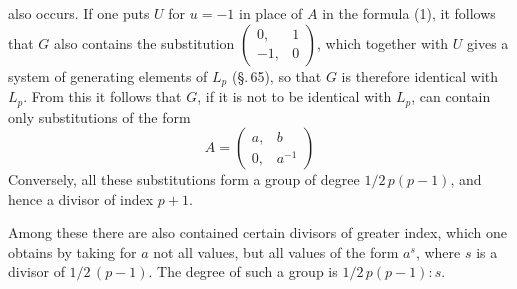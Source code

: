 also occurs. If one puts $U$ for $u = -1$ in place of $A$ in the formula (1), it follows that $G$ also contains the substitution $\begin{pmatrix}0, & 1\\ -1, & 0\end{pmatrix}$, which together with $U$ gives a system of generating elements of $L_p$ (\S.\,65), so that $G$ is therefore identical with $L_p$. From this it follows that $G$, if it is not to be identical with $L_p$, can contain only substitutions of the form
\[
A = \begin{pmatrix}a, & b\\ 0, & a^{-1}\end{pmatrix}
\]
Conversely, all these substitutions form a group of degree $1/2\,p(p-1)$, and hence a divisor of index $p+1$.

Among these there are also contained certain divisors of greater index, which one obtains by taking for $a$ not all values, but all values of the form $a^s$, where $s$ is a divisor of $1/2\,(p-1)$. The degree of such a group is $1/2\,p(p-1) : s$.
